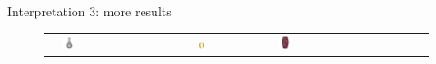 \documentclass[10pt]{beamer}
\begin{document}
\begin{frame}{Interpretation 3: more results}
\begin{figure}
\begin{tabular}{c*{4}{l}}
& \includegraphics[width=0.1\textwidth]{interp/synth_interp/vase0_ps}
& \includegraphics[width=0.1\textwidth]{interp/synth_interp/barrel_sl}
& \includegraphics[width=0.1\textwidth]{interp/synth_interp/vase1_mvs} \\
\end{tabular}
\end{figure}

\end{frame}
\end{document}
